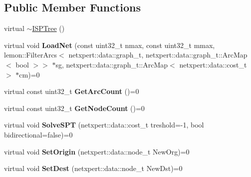 \subsection*{Public Member Functions}
\begin{DoxyCompactItemize}
\item 
virtual \hyperlink{classnetxpert_1_1core_1_1ISPTree_a7b61aa12791f75c6979e15f59638cd66}{$\sim$\+I\+S\+P\+Tree} ()
\item 
virtual void {\bfseries Load\+Net} (const uint32\+\_\+t nmax, const uint32\+\_\+t mmax, lemon\+::\+Filter\+Arcs$<$ netxpert\+::data\+::graph\+\_\+t, netxpert\+::data\+::graph\+\_\+t\+::\+Arc\+Map$<$ bool $>$$>$ $\ast$sg, netxpert\+::data\+::graph\+\_\+t\+::\+Arc\+Map$<$ netxpert\+::data\+::cost\+\_\+t $>$ $\ast$cm)=0\hypertarget{classnetxpert_1_1core_1_1ISPTree_a0f402198fc211009404778f75fa2d7cd}{}\label{classnetxpert_1_1core_1_1ISPTree_a0f402198fc211009404778f75fa2d7cd}

\item 
virtual const uint32\+\_\+t {\bfseries Get\+Arc\+Count} ()=0\hypertarget{classnetxpert_1_1core_1_1ISPTree_a55c963bcf6487959df59aa16cef0ea09}{}\label{classnetxpert_1_1core_1_1ISPTree_a55c963bcf6487959df59aa16cef0ea09}

\item 
virtual const uint32\+\_\+t {\bfseries Get\+Node\+Count} ()=0\hypertarget{classnetxpert_1_1core_1_1ISPTree_abe34ece0cc4fb8033d19cbb40b771e27}{}\label{classnetxpert_1_1core_1_1ISPTree_abe34ece0cc4fb8033d19cbb40b771e27}

\item 
virtual void {\bfseries Solve\+S\+PT} (netxpert\+::data\+::cost\+\_\+t treshold=-\/1, bool bidirectional=false)=0\hypertarget{classnetxpert_1_1core_1_1ISPTree_a2db289365cb0d26a1383cb597fd33c64}{}\label{classnetxpert_1_1core_1_1ISPTree_a2db289365cb0d26a1383cb597fd33c64}

\item 
virtual void {\bfseries Set\+Origin} (netxpert\+::data\+::node\+\_\+t New\+Org)=0\hypertarget{classnetxpert_1_1core_1_1ISPTree_a61eac5ae182237609500301be61be3fc}{}\label{classnetxpert_1_1core_1_1ISPTree_a61eac5ae182237609500301be61be3fc}

\item 
virtual void {\bfseries Set\+Dest} (netxpert\+::data\+::node\+\_\+t New\+Dst)=0\hypertarget{classnetxpert_1_1core_1_1ISPTree_a6b7b96b53e27888109e5c97d327e96fc}{}\label{classnetxpert_1_1core_1_1ISPTree_a6b7b96b53e27888109e5c97d327e96fc}


\end{DoxyCompactItemize}
